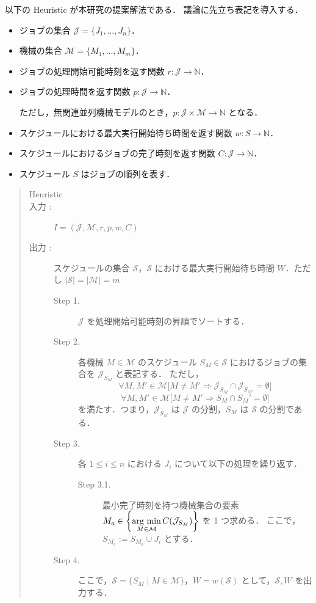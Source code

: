 \documentclass[12pt]{optlab-bachelor}
\newcommand{\argmin}{\mathop{\rm arg~min}\limits}
\begin{document}
\noindent 以下の {\sc Heuristic} が本研究の提案解法である．
議論に先立ち表記を導入する．
\begin{itemize}
  \item ジョブの集合 $\mathcal{J} = \{J_1,\ldots,J_n\}$．
  \item 機械の集合 $\mathcal{M} = \{M_1,\ldots,M_m\}$．
  \item ジョブの処理開始可能時刻を返す関数 $r : \mathcal{J} \to \mathbb{N}$．
  \item ジョブの処理時間を返す関数 $p : \mathcal{J} \to \mathbb{N}$．

  ただし，無関連並列機械モデルのとき，$p : \mathcal{J} \times \mathcal{M} \to \mathbb{N}$ となる．
  \item スケジュールにおける最大実行開始待ち時間を返す関数 $w : S \to \mathbb{N}$．
  \item スケジュールにおけるジョブの完了時刻を返す関数 $C : \mathcal{J} \to \mathbb{N}$．
  \item スケジュール $S$ はジョブの順列を表す．
\end{itemize}

\begin{quote}
  \begin{description}
    \item[{\sc Heuristic}]
    \item[入力 :] $I = (\mathcal{J}, \mathcal{M},r,p,w,C)$
    \item[出力 :] スケジュールの集合 $\mathcal{S}$，$\mathcal{S}$ における最大実行開始待ち時間 $W$．ただし $|\mathcal{S}| = |\mathcal{M}| = m$
    \begin{description}
      \item[Step 1.]
      $\mathcal{J}$ を処理開始可能時刻の昇順でソートする．
      \item[Step 2.]
      各機械 $M \in \mathcal{M}$ のスケジュール $S_M \in \mathcal{S}$ におけるジョブの集合を $\mathcal{J}_{S_M}$ と表記する．
      ただし，
      $$\forall M, M' \in \mathcal{M}\big[M \neq M' \Rightarrow \mathcal{J}_{S_M} \cap \mathcal{J}_{S_{M'}} = \emptyset \big]$$
      $$\forall M, M' \in \mathcal{M}\big[M \neq M' \Rightarrow S_M \cap S_M' = \emptyset \big]$$
      を満たす．つまり，$\mathcal{J}_{S_M}$ は $\mathcal{J}$ の分割，$S_M$ は $\mathcal{S}$ の分割である．
      \item[Step 3.]
      各 $1 \le i \le n$ における $J_i$ について以下の処理を繰り返す．
      \begin{description}
        \item[Step 3.1.] 最小完了時刻を持つ機械集合の要素 $M_a \in \left\{ \displaystyle \argmin_{M \in \mathcal{M}}C(\mathcal{J}_{S_M})\right\}$ を 1 つ求める．
        ここで，$S_{M_a} := S_{M_a} \cup J_i$ とする．
      \end{description}
      \item[Step 4.]
      ここで，$\mathcal{S} = \{ S_M \mid M \in \mathcal{M}\}$，$W = w(\mathcal{S})$ として，$\mathcal{S},W$ を出力する．
    \end{description}
  \end{description}
\end{quote}
\end{document}
